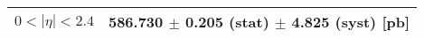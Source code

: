 \begin{tabular}{lc}
\hline
\hline
$0 < |\eta| <2.4$              & 586.730 $\pm$ 0.205 (stat) $\pm$ 4.825 (syst) [pb]  \\
\hline
\hline
\end{tabular}
